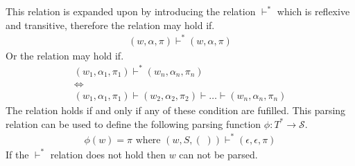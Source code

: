 This relation is expanded upon by introducing the relation $\vdash^*$ which is reflexive and transitive, therefore the relation may hold if.
\begin{gather*}
    (w, \alpha, \pi) \vdash^* (w, \alpha, \pi)
\end{gather*}
Or the relation may hold if.
\begin{gather*}
    (w_1, \alpha_1, \pi_1) \vdash^*  (w_n, \alpha_n, \pi_n) \\ \iff \\ (w_1, \alpha_1, \pi_1) \vdash (w_2, \alpha_2, \pi_2) \vdash \dots \vdash (w_n, \alpha_n, \pi_n)
\end{gather*}
The relation holds if and only if any of these condition are fufilled. This parsing relation can be used to define the following parsing function $\phi: T^* \to \mathcal{S}$.
\begin{align*}
    \phi(w) = \pi \text{ where } (w, S, (\;)) \vdash^* (\epsilon, \epsilon, \pi) 
\end{align*}
If the $\vdash^*$ relation does not hold then $w$ can not be parsed. 
